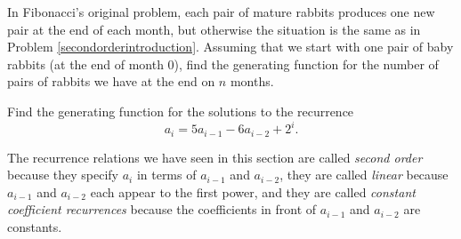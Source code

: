 \iteme In Fibonacci's original problem, each pair of mature rabbits
produces one new pair at the end of each month, but otherwise the
situation is the same as in Problem \ref{secondorderintroduction}. 
Assuming that we start with one pair of baby rabbits (at the end of month
0), find the generating function for the number of pairs of rabbits we
have at the end on $n$ months.\label{originalFibonacci}

\itemi Find the generating function for the solutions to the recurrence
$$a_i=5a_{i-1}-6a_{i-2} + 2^i.$$\label{secondordernonhomo}



\ep

The recurrence relations we have seen in this section are called
{\em second order} because they specify
$a_i$ in terms of
$a_{i-1}$ and
$a_{i-2}$, they are called {\em
linear} because
$a_{i-1}$ and
$a_{i-2}$ each appear to the first power, and they are called {\em
constant coefficient recurrences}
because the coefficients in front of
$a_{i-1}$ and $a_{i-2}$ are constants.

